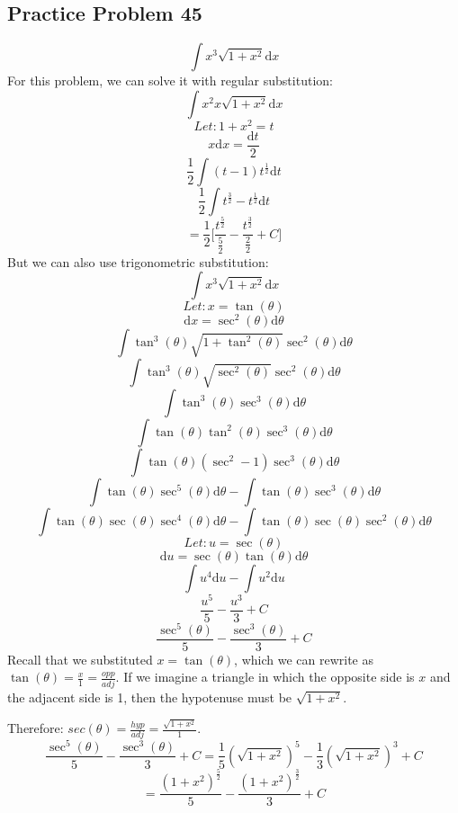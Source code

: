 \documentclass[letterpaper, 12pt]{article}
\newcommand*{\diff}{\mathrm{d}}
\begin{document}
\subsection*{Practice Problem 45}
\[ \int{x^{3}\sqrt{1+x^{2}}\diff{x}} \]
For this problem, we can solve it with regular substitution:
\[ \int{x^{2}x\sqrt{1+x^{2}}\diff{x}} \]
\[ Let: 1+x^{2} = t \]
\[ x\diff{x} = \frac{\diff{t}}{2} \]
\[ \frac{1}{2}\int{(t-1)t^{\frac{1}{2}}\diff{t}} \]
\[ \frac{1}{2}\int{t^{\frac{3}{2}}-t^{\frac{1}{2}}\diff{t}} \]
\[ = \frac{1}{2}\bigg[\frac{t^{\frac{5}{2}}}{\frac{5}{2}}-
     \frac{t^{\frac{3}{2}}}{\frac{2}{2}}+C\bigg] \]
But we can also use trigonometric substitution:
\[ \int{x^{3}\sqrt{1+x^{2}}\diff{x}} \]
\[ Let: x = \tan(\theta) \]
\[ \diff{x} = \sec^{2}(\theta)\diff{\theta} \]
\[ \int{\tan^{3}(\theta)\sqrt{1+\tan^{2}(\theta)}
   \sec^{2}(\theta)\diff{\theta}} \]
\[ \int{\tan^{3}(\theta)\sqrt{\sec^{2}(\theta)}
   \sec^{2}(\theta)\diff{\theta}} \]
\[ \int{\tan^{3}(\theta)\sec^{3}(\theta)\diff{\theta}} \]
\[ \int{\tan(\theta)\tan^{2}(\theta)\sec^{3}(\theta)\diff{\theta}} \]
\[ \int{\tan(\theta)(\sec^{2}-1)\sec^{3}(\theta)\diff{\theta}} \]
\[ \int{\tan(\theta)\sec^{5}(\theta)\diff{\theta}}-
   \int{\tan(\theta)\sec^{3}(\theta)\diff{\theta}} \]
\[ \int{\tan(\theta)\sec(\theta)\sec^{4}(\theta)\diff{\theta}}-
   \int{\tan(\theta)\sec(\theta)\sec^{2}(\theta)\diff{\theta}} \]
\[ Let: u = \sec(\theta) \]
\[ \diff{u} = \sec(\theta)\tan(\theta)\diff{\theta} \]
\[ \int{u^{4}\diff{u}}- \int{u^{2}\diff{u}} \]
\[ \frac{u^{5}}{5}-\frac{u^{3}}{3}+C \]
\[ \frac{\sec^{5}(\theta)}{5}-\frac{\sec^{3}(\theta)}{3}+C \]
Recall that we substituted \( x = \tan(\theta) \), which we can rewrite as
\( \tan(\theta) = \frac{x}{1} = \frac{opp}{adj} \). If we imagine a triangle in
which the opposite side is \( x \) and the adjacent side is 1, then the
hypotenuse must be \( \sqrt{1+x^{2}} \).
\begin{center}
\end{center}
Therefore: \( sec(\theta) = \frac{hyp}{adj} = \frac{\sqrt{1+x^{2}}}{1} \).
\[ \frac{\sec^{5}(\theta)}{5}-\frac{\sec^{3}(\theta)}{3}+C =
   \frac{1}{5}(\sqrt{1+x^{2}})^{5}-\frac{1}{3}(\sqrt{1+x^{2}})^{3}+C \]
\[ = \frac{(1+x^{2})^{\frac{5}{2}}}{5}-\frac{(1+x^{2})^{\frac{3}{2}}}{3}+C \]
\end{document}
